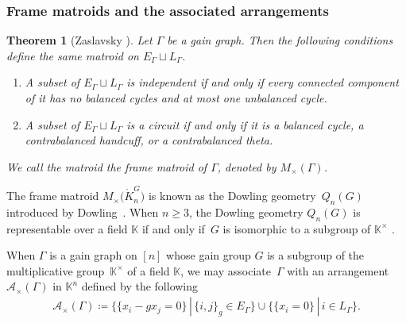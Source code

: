 \documentclass[pdftex]{sigma}
\numberwithin{equation}{section}
\newtheorem{Theorem}{Theorem}[section]
\begin{document}
\subsubsection{Frame matroids and the associated arrangements}
\begin{Theorem}[{Zaslavsky \cite[Theorem 2.1]{zaslavsky1991biased-joctsb}}]\label{Zaslavsky frame matroid}
Let $ \Gamma $ be a gain graph.
Then the following conditions define the same matroid on $ E_{\Gamma} \sqcup L_{\Gamma} $.
\begin{enumerate}[$(a)$]\itemsep=0pt
\item\label{Zaslavsky frame matroid a} A subset of $ E_{\Gamma} \sqcup L_{\Gamma} $ is independent if and only if every connected component of it has no balanced cycles and at most one unbalanced cycle.
\item\label{Zaslavsky frame matroid b} A subset of $ E_{\Gamma} \sqcup L_{\Gamma} $ is a circuit if and only if it is a balanced cycle, a contrabalanced handcuff, or a contrabalanced theta.
\end{enumerate}
We call the matroid the \textit{frame matroid} of $ \Gamma $, denoted by $ M_{\times}(\Gamma) $.
\end{Theorem}

The frame matroid $ M_{\times}\big(\mathring{K}_{n}^{G}\big) $ is known as the Dow\-ling geometry~$ Q_{n}(G) $ introduced by Dow\-ling~\cite{dowling1973class-joctsb}.
When $ n \geq 3 $, the Dowling geometry $ Q_{n}(G) $ is representable over a field $ \mathbb{K} $ if and only if~$ G $ is isomorphic to a subgroup of $ \mathbb{K}^{\times} $ \cite[Theorem~9]{dowling1973class-joctsb}.

When $ \Gamma $ is a gain graph on $ [n] $ whose gain group $ G $ is a subgroup of the multiplicative group~$ \mathbb{K}^{\times} $ of a field $ \mathbb{K} $, we may associate~$ \Gamma $ with an arrangement $ \mathcal{A}_{\times}(\Gamma) $ in $ \mathbb{K}^{n} $ defined by the following
\begin{gather*}
\mathcal{A}_{\times}(\Gamma) \coloneqq \{\{x_{i}-gx_{j} = 0\} \,|\, \{i,j\}_{g} \in E_{\Gamma}\} \cup \{\{x_{i}=0\} \,|\, i \in L_{\Gamma}\}.
\end{gather*}
\end{document}

